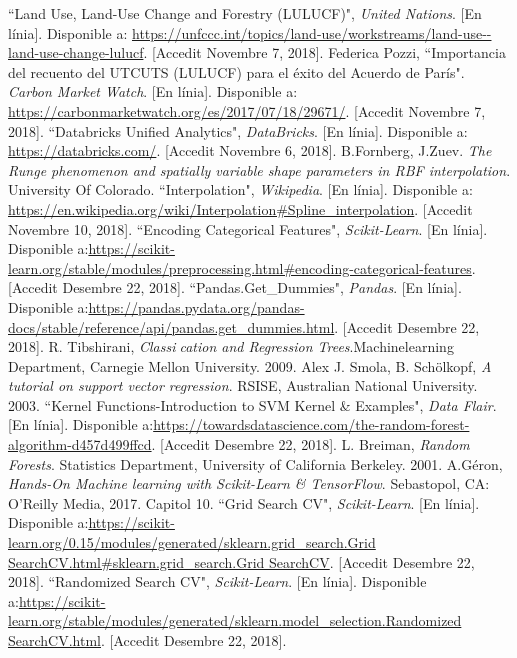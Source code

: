 \documentclass[10pt,a4paper,twocolumn,twoside]{article}
\begin{document}
\begin{thebibliography}{11}
 ``Land Use, Land-Use Change and Forestry (LULUCF)", \textit{United Nations}. [En línia]. Disponible a: \url{ https://unfccc.int/topics/land-use/workstreams/land-use--land-use-change-lulucf}. [Accedit Novembre 7, 2018].
Federica Pozzi, ``Importancia del recuento del UTCUTS (LULUCF) para el éxito del Acuerdo de París". \textit{Carbon Market Watch}. [En línia]. Disponible a: \url{https://carbonmarketwatch.org/es/2017/07/18/29671/}. [Accedit Novembre 7, 2018].
``Databricks Unified Analytics", \textit{DataBricks}. [En línia]. Disponible a: \url{https://databricks.com/}. [Accedit Novembre 6, 2018].
B.Fornberg, J.Zuev. \textit{The Runge phenomenon and spatially variable shape parameters in RBF interpolation}. University Of Colorado.
 ``Interpolation", \textit{Wikipedia}. [En línia]. Disponible a: \url{https://en.wikipedia.org/wiki/Interpolation#Spline_interpolation}. [Accedit Novembre 10, 2018].
``Encoding Categorical Features", \textit{Scikit-Learn}. [En línia]. Disponible a:\url{https://scikit-learn.org/stable/modules/preprocessing.html#encoding-categorical-features}. [Accedit Desembre 22, 2018].
``Pandas.Get\_Dummies", \textit{Pandas}. [En línia]. Disponible a:\url{https://pandas.pydata.org/pandas-docs/stable/reference/api/pandas.get_dummies.html}. [Accedit Desembre 22, 2018].
R. Tibshirani, \textit{Classication and Regression Trees}.Machinelearning Department, Carnegie Mellon University. 2009.
Alex J. Smola, B. Schölkopf, \textit{A tutorial on support vector regression}. RSISE, Australian National University. 2003.
``Kernel Functions-Introduction to SVM Kernel \& Examples", \textit{Data Flair}. [En línia]. Disponible a:\url{https://towardsdatascience.com/the-random-forest-algorithm-d457d499ffcd}. [Accedit Desembre 22, 2018].
L. Breiman, \textit{Random Forests}. Statistics Department, University of California Berkeley. 2001.
A.Géron, \textit{Hands-On Machine learning with Scikit-Learn \& TensorFlow}. Sebastopol, CA: O’Reilly Media, 2017. Capitol 10.
``Grid Search CV", \textit{Scikit-Learn}. [En línia]. Disponible a:\url{https://scikit-learn.org/0.15/modules/generated/sklearn.grid_search.Grid SearchCV.html#sklearn.grid_search.Grid SearchCV}. [Accedit Desembre 22, 2018].
``Randomized Search CV", \textit{Scikit-Learn}. [En línia]. Disponible a:\url{https://scikit-learn.org/stable/modules/generated/sklearn.model_selection.Randomized SearchCV.html}. [Accedit Desembre 22, 2018].

\end{thebibliography}
\clearpage
\end{document}
